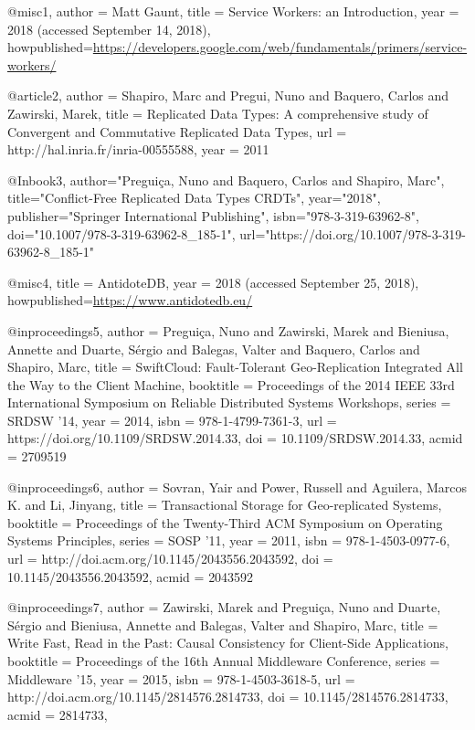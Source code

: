 @misc{1,
author = {Matt Gaunt},
title = {Service Workers: an Introduction},
year = {2018 (accessed September 14, 2018)}, 
howpublished={\url{https://developers.google.com/web/fundamentals/primers/service-workers/}}
}

@article{2,
author = {Shapiro, Marc and Pregui, Nuno and Baquero, Carlos and Zawirski, Marek},
title = {{Replicated Data Types: A comprehensive study of Convergent and Commutative Replicated Data Types}},
url = {http://hal.inria.fr/inria-00555588},
year = {2011}
}

@Inbook{3,
author="Pregui{\c{c}}a, Nuno and Baquero, Carlos and Shapiro, Marc",
title="Conflict-Free Replicated Data Types CRDTs",
year="2018",
publisher="Springer International Publishing",
isbn="978-3-319-63962-8",
doi="10.1007/978-3-319-63962-8_185-1",
url="https://doi.org/10.1007/978-3-319-63962-8_185-1"
}

@misc{4,
title = {AntidoteDB},
year = {2018 (accessed September 25, 2018)}, 
howpublished={\url{https://www.antidotedb.eu/}}
}

@inproceedings{5,
 author = {Pregui\c{c}a, Nuno and Zawirski, Marek and Bieniusa, Annette and Duarte, S{\'e}rgio and Balegas, Valter and Baquero, Carlos and Shapiro, Marc},
 title = {SwiftCloud: Fault-Tolerant Geo-Replication Integrated All the Way to the Client Machine},
 booktitle = {Proceedings of the 2014 IEEE 33rd International Symposium on Reliable Distributed Systems Workshops},
 series = {SRDSW '14},
 year = {2014},
 isbn = {978-1-4799-7361-3},
 url = {https://doi.org/10.1109/SRDSW.2014.33},
 doi = {10.1109/SRDSW.2014.33},
 acmid = {2709519}
} 

@inproceedings{6,
 author = {Sovran, Yair and Power, Russell and Aguilera, Marcos K. and Li, Jinyang},
 title = {Transactional Storage for Geo-replicated Systems},
 booktitle = {Proceedings of the Twenty-Third ACM Symposium on Operating Systems Principles},
 series = {SOSP '11},
 year = {2011},
 isbn = {978-1-4503-0977-6},
 url = {http://doi.acm.org/10.1145/2043556.2043592},
 doi = {10.1145/2043556.2043592},
 acmid = {2043592}
} 

@inproceedings{7,
 author = {Zawirski, Marek and Pregui\c{c}a, Nuno and Duarte, S{\'e}rgio and Bieniusa, Annette and Balegas, Valter and Shapiro, Marc},
 title = {Write Fast, Read in the Past: Causal Consistency for Client-Side Applications},
 booktitle = {Proceedings of the 16th Annual Middleware Conference},
 series = {Middleware '15},
 year = {2015},
 isbn = {978-1-4503-3618-5},
 url = {http://doi.acm.org/10.1145/2814576.2814733},
 doi = {10.1145/2814576.2814733},
 acmid = {2814733},
} 


